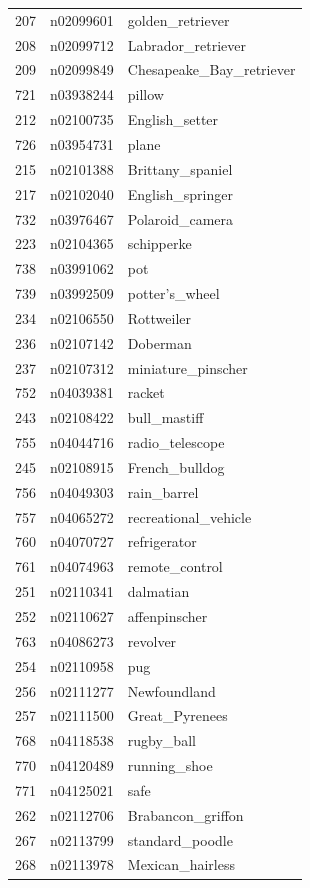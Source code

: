 \begin{table}
\begin{tabular}{cll}
207 & n02099601 & golden_retriever \\
208 & n02099712 & Labrador_retriever \\
209 & n02099849 & Chesapeake_Bay_retriever \\
721 & n03938244 & pillow \\
212 & n02100735 & English_setter \\
726 & n03954731 & plane \\
215 & n02101388 & Brittany_spaniel \\
217 & n02102040 & English_springer \\
732 & n03976467 & Polaroid_camera \\
223 & n02104365 & schipperke \\
738 & n03991062 & pot \\
739 & n03992509 & potter's_wheel \\
234 & n02106550 & Rottweiler \\
236 & n02107142 & Doberman \\
237 & n02107312 & miniature_pinscher \\
752 & n04039381 & racket \\
243 & n02108422 & bull_mastiff \\
755 & n04044716 & radio_telescope \\
245 & n02108915 & French_bulldog \\
756 & n04049303 & rain_barrel \\
757 & n04065272 & recreational_vehicle \\
760 & n04070727 & refrigerator \\
761 & n04074963 & remote_control \\
251 & n02110341 & dalmatian \\
252 & n02110627 & affenpinscher \\
763 & n04086273 & revolver \\
254 & n02110958 & pug \\
256 & n02111277 & Newfoundland \\
257 & n02111500 & Great_Pyrenees \\
768 & n04118538 & rugby_ball \\
770 & n04120489 & running_shoe \\
771 & n04125021 & safe \\
262 & n02112706 & Brabancon_griffon \\
267 & n02113799 & standard_poodle \\
268 & n02113978 & Mexican_hairless \\

\end{tabular}
\end{table}
